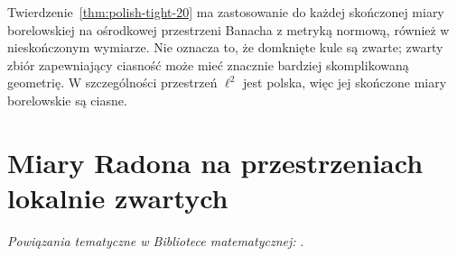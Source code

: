 \begin{przyklad}
Twierdzenie~\ref{thm:polish-tight-20} ma zastosowanie
do każdej skończonej miary borelowskiej na ośrodkowej
przestrzeni Banacha z metryką normową, również w nieskończonym
wymiarze. Nie oznacza to, że domknięte kule są zwarte;
zwarty zbiór zapewniający ciasność może mieć znacznie
bardziej skomplikowaną geometrię. W szczególności
przestrzeń $\ell^2$ jest polska, więc jej skończone
miary borelowskie są ciasne.
\end{przyklad}

\section{Miary Radona na przestrzeniach lokalnie zwartych}

\noindent\emph{Powiązania tematyczne w Bibliotece matematycznej:} .

